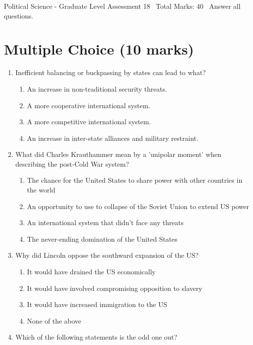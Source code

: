 \documentclass[12pt]{article}
\begin{document}
\begin{center}
Political Science - Graduate Level Assessment 18 \
Total Marks: 40 \
Answer all questions.
\end{center}

\section*{Multiple Choice (10 marks)}
\begin{enumerate}[label=\arabic*.]
\item Inefficient balancing or buckpassing by states can lead to what?
\begin{enumerate}[label=(\alph*)]
    \item An increase in non-traditional security threats.
    \item A more cooperative international system.
    \item A more competitive international system.
    \item An increase in inter-state alliances and military restraint.
\end{enumerate}
\item What did Charles Krauthammer mean by a 'unipolar moment' when describing the post-Cold War system?
\begin{enumerate}[label=(\alph*)]
    \item The chance for the United States to share power with other countries in the world
    \item An opportunity to use to collapse of the Soviet Union to extend US power
    \item An international system that didn't face any threats
    \item The never-ending domination of the United States
\end{enumerate}
\item Why did Lincoln oppose the southward expansion of the US?
\begin{enumerate}[label=(\alph*)]
    \item It would have drained the US economically
    \item It would have involved compromising opposition to slavery
    \item It would have increased immigration to the US
    \item None of the above
\end{enumerate}
\item Which of the following statements is the odd one out?
\begin{enumerate}[label=(\alph*)]

\end{enumerate}
\end{enumerate}
\end{document}

